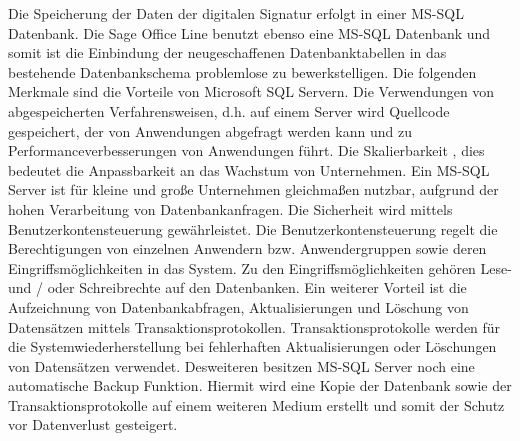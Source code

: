 Die Speicherung der Daten der digitalen Signatur erfolgt in einer MS-SQL Datenbank. Die Sage Office Line benutzt ebenso eine MS-SQL Datenbank und somit ist die Einbindung der neugeschaffenen Datenbanktabellen in das bestehende Datenbankschema problemlose zu bewerkstelligen. Die folgenden  Merkmale sind die Vorteile von Microsoft SQL Servern. Die Verwendungen von abgespeicherten Verfahrensweisen, d.h. auf einem Server wird Quellcode  gespeichert, der von Anwendungen abgefragt werden kann und zu Performanceverbesserungen von Anwendungen führt. Die Skalierbarkeit , dies bedeutet die Anpassbarkeit an das Wachstum von Unternehmen. Ein MS-SQL Server ist für kleine und große Unternehmen gleichmaßen nutzbar, aufgrund der hohen Verarbeitung von Datenbankanfragen. Die Sicherheit wird mittels Benutzerkontensteuerung gewährleistet. Die Benutzerkontensteuerung regelt die Berechtigungen von einzelnen Anwendern bzw. Anwendergruppen sowie deren Eingriffsmöglichkeiten in das System. Zu den Eingriffsmöglichkeiten gehören Lese- und / oder Schreibrechte auf den Datenbanken. Ein weiterer Vorteil ist die Aufzeichnung von Datenbankabfragen, Aktualisierungen und Löschung von Datensätzen mittels Transaktionsprotokollen. Transaktionsprotokolle werden für die Systemwiederherstellung bei fehlerhaften Aktualisierungen oder Löschungen von Datensätzen verwendet. Desweiteren besitzen MS-SQL Server noch eine automatische Backup Funktion. Hiermit wird eine Kopie der Datenbank sowie der Transaktionsprotokolle auf einem weiteren Medium erstellt und somit der Schutz vor Datenverlust gesteigert. \cite{SQLv1}
